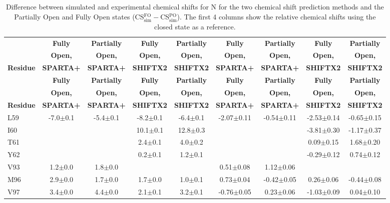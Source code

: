 \documentclass[%
 aip,
 amsmath,amssymb,
 preprint,%
]{revtex4-1}
\begin{document}
\begingroup
\begin{center}
\begin{longtable}{l|c|c|c|c|c|c|c|c}
\caption{\scriptsize Difference between simulated and experimental chemical shifts for N for the two chemical shift prediction methods and the Partially Open and Fully Open states (CS$_\text{sim}^\text{FO}-$CS$_\text{sim}^\text{PO}$). The first 4 columns show the relative chemical shifts using the closed state as a reference.  \label{SI_tb_DDCS_N}}\\ 
\hline 
\hline 
& \textbf{Fully} & \textbf{Partially} & \textbf{Fully} & \textbf{Partially} & \textbf{Fully} & \textbf{Partially} & \textbf{Fully} & \textbf{Partially} \\
& \textbf{Open,} & \textbf{Open,} & \textbf{Open,} & \textbf{Open,} & \textbf{Open,} & \textbf{Open,} & \textbf{Open,} & \textbf{Open,} \\
\textbf{Residue} & \textbf{SPARTA+} & \textbf{SPARTA+} & \textbf{SHIFTX2} & \textbf{SHIFTX2} & \textbf{SPARTA+} & \textbf{SPARTA+} & \textbf{SHIFTX2} & \textbf{SHIFTX2} \\
\hline
\endfirsthead 
\hline
& \textbf{Fully} & \textbf{Partially} & \textbf{Fully} & \textbf{Partially} & \textbf{Fully} & \textbf{Partially} & \textbf{Fully} & \textbf{Partially} \\
& \textbf{Open,} & \textbf{Open,} & \textbf{Open,} & \textbf{Open,} & \textbf{Open,} & \textbf{Open,} & \textbf{Open,} & \textbf{Open,} \\
\textbf{Residue} & \textbf{SPARTA+} & \textbf{SPARTA+} & \textbf{SHIFTX2} & \textbf{SHIFTX2} & \textbf{SPARTA+} & \textbf{SPARTA+} & \textbf{SHIFTX2} & \textbf{SHIFTX2} \\ \hline
\endhead
L59 & -7.0$\pm$0.1 & -5.4$\pm$0.1 & -8.2$\pm$0.1 & -6.4$\pm$0.1 & -2.07$\pm$0.11 & -0.54$\pm$0.11 & -2.53$\pm$0.14 & -0.65$\pm$0.15 \\
I60 & & & 10.1$\pm$0.1 & 12.8$\pm$0.3 & & & -3.81$\pm$0.30 & -1.17$\pm$0.37 \\
T61 & & & 2.4$\pm$0.1 & 4.0$\pm$0.2 & & & 0.09$\pm$0.15 & 1.68$\pm$0.20 \\
Y62 & & & 0.2$\pm$0.1 & 1.2$\pm$0.1 & & & -0.29$\pm$0.12 & 0.74$\pm$0.12 \\
V93 & 1.2$\pm$0.0 & 1.8$\pm$0.0 & & & 0.51$\pm$0.08 & 1.12$\pm$0.06 & & \\
M96 & 2.9$\pm$0.0 & 1.7$\pm$0.0 & 1.7$\pm$0.0 & 1.0$\pm$0.1 & 0.73$\pm$0.04 & -0.42$\pm$0.05 & 0.26$\pm$0.06 & -0.44$\pm$0.08 \\
V97 & 3.4$\pm$0.0 & 4.4$\pm$0.0 & 2.1$\pm$0.1 & 3.2$\pm$0.1 & -0.76$\pm$0.05 & 0.23$\pm$0.06 & -1.03$\pm$0.09 & 0.04$\pm$0.10 \\

\end{longtable}
\end{center}
\end{document}
